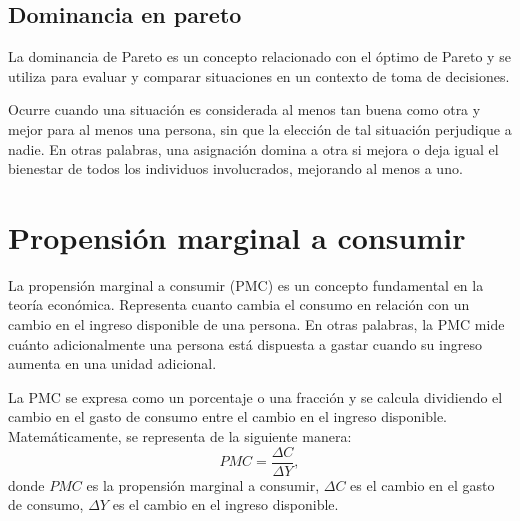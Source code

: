 \subsection{Dominancia en pareto}
La dominancia de Pareto es un concepto relacionado con el óptimo de Pareto y se utiliza para evaluar y comparar situaciones en un contexto de toma de decisiones. 

Ocurre cuando una situación es considerada al menos tan buena como otra y mejor para al menos una persona, sin que la elección de tal situación perjudique a nadie. En otras palabras, una asignación domina a otra si mejora o deja igual el bienestar de todos los individuos involucrados, mejorando al menos a uno.


\section{Propensión marginal a consumir} \label{Sec_pmp}
La propensión marginal a consumir (PMC) es un concepto fundamental en la teoría económica. Representa cuanto cambia el consumo en relación con un cambio en el ingreso disponible de una persona. En otras palabras, la PMC mide cuánto adicionalmente una persona está dispuesta a gastar cuando su ingreso aumenta en una unidad adicional.

La PMC se expresa como un porcentaje o una fracción y se calcula dividiendo el cambio en el gasto de consumo entre el cambio en el ingreso disponible. Matemáticamente, se representa de la siguiente manera:
%
$$PMC = \dfrac{\Delta C}{\Delta Y},$$
%
donde $PMC$ es la propensión marginal a consumir, $\Delta C$ es el cambio en el gasto de consumo, $\Delta Y$ es el cambio en el ingreso disponible.